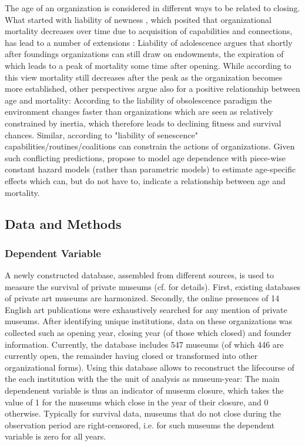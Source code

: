 \documentclass[12pt]{article}
\begin{document}
The age of an organization is considered in different ways to be related to closing.
What started with liability of newness \parencite{Stinchcombe_1965_structure}, which posited that organizational mortality decreases over time due to acquisition of capabilities and connections, has lead to a number of extensions \parencite{Carroll_Khessina_2019_demography,Hannan_1998_mortality}:
Liability of adolescence argues that shortly after foundings organizations can still draw on endowments, the expiration of which leads to a peak of mortality some time after opening.
While according to this view mortality still decreases after the peak as the organization becomes more established, other perspectives argue also for a positive relationship between age and mortality:
According to the liability of obsolescence paradigm the environment changes faster than organizations which are seen as relatively constrained by inertia, which therefore leads to declining fitness and survival chances.
Similar, according to "liability of senescence" capabilities/routines/coalitions can constrain the actions of organizations.
Given such conflicting predictions, \textcite{Carroll_Khessina_2019_demography} propose to model age dependence with piece-wise constant hazard models (rather than parametric models) to estimate age-specific effects which can, but do not have to, indicate a relationship between age and mortality.




\subsection*{Data and Methods}


\subsubsection*{Dependent Variable}

A newly constructed database, assembled from different sources,  is used to measure the survival of private museums (cf. \textcite{Velthuis_etal_2023_boom} for details).
First, existing databases of private art museums are harmonized.
Secondly, the online presences of 14 English art publications were exhaustively searched for any mention of private museums.
After identifying unique institutions, data on these organizations was collected such as opening year, closing year (of those which closed) and founder information.
Currently, the database includes 547 museums (of which 446 are currently open, the remainder having closed or transformed into other organizational forms).
Using this database allows to reconstruct the lifecourse of the each institution with the the unit of analysis as museum-year:
The main dependenent variable is thus an indicator of museum closure, which takes the value of 1 for the museums which close in the year of their closure, and 0 otherwise.
Typically for survival data, museums that do not close during the observation period are right-censored, i.e. for such museums the dependent variable is zero for all years.
\end{document}
